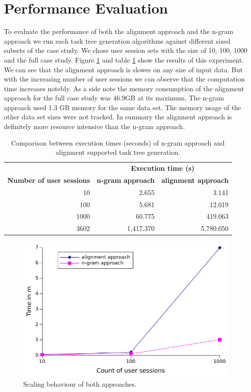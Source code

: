 \section{Performance Evaluation}
To evaluate the performance of both the alignment approach and the n-gram approach we run each task tree generation algorithms against different sized subsets of the case study.
We chose user session sets with the size of 10, 100, 1000 and the full case study. Figure \ref{fig:performance} and table \ref{tab:comparisontasktreegenerations} show the results of this experiment.
We can see that the alignment approach is slower on any size of input data.
But with the increasing number of user sessions we can observe that the computation time increases notebly.
As a side note the memory consumption of the alignment approach for the full case study was 46.9GB at its maximum.
The n-gram approach used 1.3 GB memory for the same data set.
The memory usage of the other data set sizes were not tracked.
In summary the alignment approach is definitely more resource intensive than the n-gram approach.
\begin{table}[h]
	\centering
	\begin{tabular}{ r r r }
		\toprule
		& \multicolumn{2}{c}{\textbf{Execution time (s)}} \\
		\cmidrule{2-3}
		\textbf{Number of user sessions} & \textbf{n-gram approach} & \textbf{alignment approach} \\
		\midrule
		10 	& 2.655	& 3.141\\
		100 	& 5.681	& 12.019\\
		1000 	& 60.775	& 419.063\\
		\midrule
		3602 	& 1,417.370 & 5,780.050\\
		\bottomrule
	\end{tabular}
	\caption{Comparison between execution times (seconds) of n-gram approach and alignment supported task tree generation.}
	\label{tab:comparisontasktreegenerations}
\end{table}


 \begin{figure}[h]
	\centering
	\includegraphics[]{chapters/casestudy/performance.pdf}
	\caption{Scaling behaviour of both approaches.}
	\label{fig:performance}
\end{figure}



